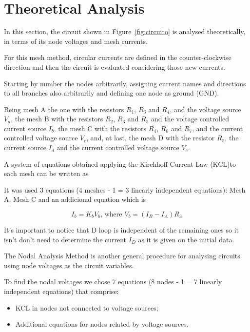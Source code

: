 \section{Theoretical Analysis}
\label{sec:analysis}

\hspace{0,5cm} In this section, the circuit shown in Figure~\ref{fig:circuito} is analysed theoretically, in terms of its node voltages and mesh currents.

For this mesh method, circular currents are defined in the counter-clockwise direction and then the circuit is evaluated considering those new currents.

Starting by number the nodes arbitrarily, assigning current names and directions to all branches also arbitrarily and defining one node as ground (GND). 

Being mesh A the one with the resistors $R_1$, $R_3$ and $R_4$, and the voltage source $V_a$, the mesh B with the resistors $R_2$, $R_3$ and $R_5$ and the voltage controlled current source $I_b$, the mesh C with the resistors $R_4$, $R_6$ and $R_7$, and the current controlled voltage source $V_c$, and, at last, the mesh D with the resistor $R_5$, the current source $I_d$ and the current controlled voltage source $V_c$. 

A system of equations obtained applying the Kirchhoff Current Law (KCL)to each mesh can be written as 


It was used 3 equations (4 meshes - 1 = 3 linearly independent equations): Mesh A, Mesh C and an addicional equation which is 

\begin{equation}
I_b = K_b V_b \textrm{, where } V_b = (I_B - I_A)R_3
\end{equation}

It's important to notice that D loop is independent of the remaining ones so it isn't don't need to determine the current $I_D$ as it is given on the initial data.



The Nodal Analysis Method is another general procedure for analysing circuits using node voltages as the circuit variables. 

To find the nodal voltages we chose 7 equations (8 nodes - 1 = 7 linearly independent equations) that comprise:
\begin{itemize}
\item  KCL in nodes not connected to voltage sources;
\item Additional equations for nodes related by voltage sources.
\end{itemize}

